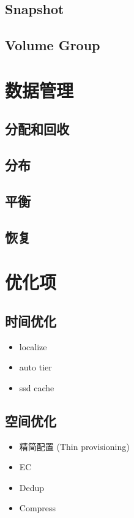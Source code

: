 \documentclass[UTF8]{ctexart}
\begin{document}
\subsection{Snapshot}
\subsection{Volume Group}

\section{数据管理}

\subsection{分配和回收}
\subsection{分布}
\subsection{平衡}
\subsection{恢复}

\section{优化项}

\subsection{时间优化}

\begin{itemize}
    \item localize
    \item auto tier
    \item ssd cache
\end{itemize}

\subsection{空间优化}

\begin{itemize}
    \item 精简配置 (Thin provisioning)
    \item EC
    \item Dedup
    \item Compress
\end{itemize}
\end{document}
